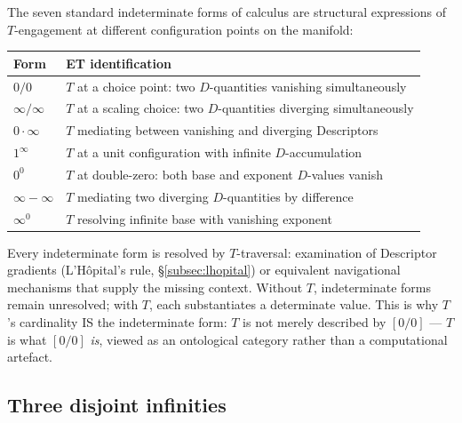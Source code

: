 \documentclass[11pt,a4paper]{article}
\theoremstyle{definition}
\theoremstyle{remark}
\begin{document}
The seven standard indeterminate forms of calculus are structural expressions of $T$-engagement at different configuration points on the manifold:

\begin{center}
\begin{tabular}{ll}
\toprule
\textbf{Form} & \textbf{ET identification} \\
\midrule
$0/0$ & $T$ at a choice point: two $D$-quantities vanishing simultaneously \\
$\infty/\infty$ & $T$ at a scaling choice: two $D$-quantities diverging simultaneously \\
$0 \cdot \infty$ & $T$ mediating between vanishing and diverging Descriptors \\
$1^{\infty}$ & $T$ at a unit configuration with infinite $D$-accumulation \\
$0^{0}$ & $T$ at double-zero: both base and exponent $D$-values vanish \\
$\infty - \infty$ & $T$ mediating two diverging $D$-quantities by difference \\
$\infty^{0}$ & $T$ resolving infinite base with vanishing exponent \\
\bottomrule
\end{tabular}
\end{center}

Every indeterminate form is resolved by $T$-traversal: examination of Descriptor gradients (L'H\^opital's rule, \S\ref{subsec:lhopital}) or equivalent navigational mechanisms that supply the missing context. Without $T$, indeterminate forms remain unresolved; with $T$, each substantiates a determinate value. This is why $T$'s cardinality IS the indeterminate form: $T$ is not merely described by $[0/0]$ --- $T$ is what $[0/0]$ \emph{is}, viewed as an ontological category rather than a computational artefact.

\subsection{Three disjoint infinities}\label{subsec:three-infinities}
\end{document}
